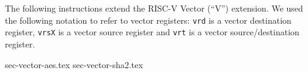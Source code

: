 
The following instructions extend the RISC-V Vector (``V'') extension.
We used the following notation to refer to vector registers:
{\tt vrd}  is a vector        destination register,
{\tt vrsX} is a vector source             register
and
{\tt vrt}  is a vector source/destination register.


{sec-vector-aes.tex}
{sec-vector-sha2.tex}

